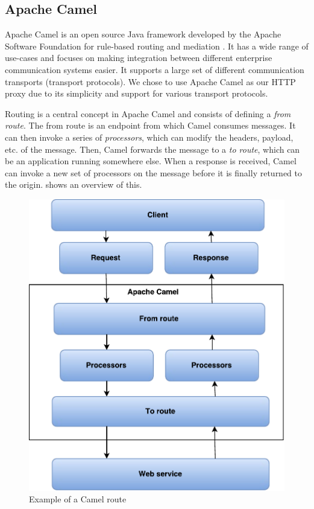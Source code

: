 \subsection{Apache Camel}

Apache Camel is an open source Java framework developed by the Apache Software
Foundation for rule-based routing and mediation \cite{camel-homepage}. It has a
wide range of use-cases and focuses on making integration between different
enterprise communication systems easier. It supports a large set of different
communication transports (transport protocols). We chose to use Apache Camel as
our HTTP proxy due to its simplicity and support for various transport
protocols.

Routing is a central concept in Apache Camel and consists of defining a
\textit{from route}. The from route is an endpoint from which Camel consumes
messages. It can then invoke a series of \textit{processors}, which can modify
the headers, payload, etc. of the message. Then, Camel forwards the message to a
\textit{to route}, which can be an application running somewhere else. When a
response is received, Camel can invoke a new set of processors on the message
before it is finally returned to the origin.  shows an
overview of this.

\begin{figure}[h]
\centering
\includegraphics[scale=0.6]{images/camel_routes.pdf}
\caption{Example of a Camel route}
\label{figure:camel-route}
\end{figure}

